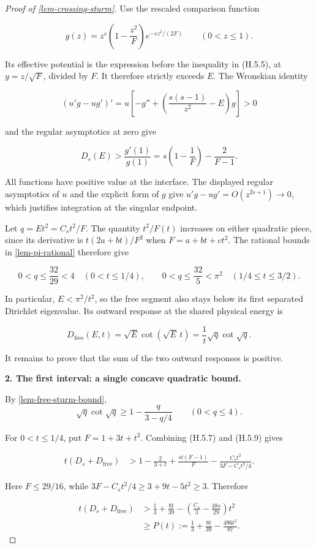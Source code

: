 \documentclass[11pt,a4paper]{article}
\theoremstyle{proofmanuscript}
\begin{document}
\begin{proof}[Proof of \ref{lem-crossing-sturm}]
Use the rescaled comparison function

\[
g(z)=z^s\left(1-\frac{z^2}{F}\right)e^{-s z^2/(2F)}\qquad(0<z\le1).
\]

Its effective potential is the expression before the inequality in (H.5.5), at \(y=z/\sqrt F\), divided by \(F\). It therefore strictly exceeds \(E\). The Wronskian identity

\[
(u'g-ug')'=u\left[-g''+\left(\frac{s(s-1)}{z^2}-E\right)g\right]>0
\]

and the regular asymptotics at zero give

\[
D_s(E)>\frac{g'(1)}{g(1)}
=s\left(1-\frac1F\right)-\frac2{F-1}.
\tag{H.5.7}
\]

All functions have positive value at the interface. The displayed regular asymptotics of \(u\) and the explicit form of \(g\) give \(u'g-ug'=O(z^{2s+1})\to0\), which justifies integration at the singular endpoint.

Let \(q=Et^2=C_st^2/F\). The quantity \(t^2/F(t)\) increases on either quadratic piece, since its derivative is \(t(2a+bt)/F^2\) when \(F=a+bt+ct^2\). The rational bounds in \ref{lem-pi-rational} therefore give

\[
0<q\le\frac{32}{29}<4\quad(0<t\le1/4),
\qquad
0<q\le\frac{32}{5}<\pi^2\quad(1/4\le t\le3/2).
\tag{H.5.8}
\]

In particular, \(E<\pi^2/t^2\), so the free segment also stays below its first separated Dirichlet eigenvalue. Its outward response at the shared physical energy is

\[
D_{\mathrm{free}}(E,t)=\sqrt E\cot(\sqrt E\,t)
=\frac1t\sqrt q\cot\sqrt q.
\]

It remains to prove that the sum of the two outward responses is positive.

\textbf{2. The first interval: a single concave quadratic bound.}

By \ref{lem-free-sturm-bound}, \[
\sqrt q\cot\sqrt q\ge1-\frac{q}{3-q/4}
\qquad(0<q\le4).
\tag{H.5.9}
\]

For \(0<t\le1/4\), put \(F=1+3t+t^2\). Combining (H.5.7) and (H.5.9) gives

\[
\begin{aligned}
t(D_s+D_{\mathrm{free}})
&>1-\frac2{3+t}+\frac{s t(F-1)}F
-\frac{C_s t^2}{3F-C_st^2/4}.
\end{aligned}
\]

Here \(F\le29/16\), while \(3F-C_st^2/4\ge3+9t-5t^2\ge3\). Therefore

\[
\begin{aligned}
t(D_s+D_{\mathrm{free}})
&>\frac13+\frac{8t}{39}
-\left(\frac{C_s}{3}-\frac{48s}{29}\right)t^2\\
&\ge P(t):=\frac13+\frac{8t}{39}-\frac{496t^2}{87}.
\end{aligned}
\tag{H.5.10}
\]


\end{proof}
\end{document}
